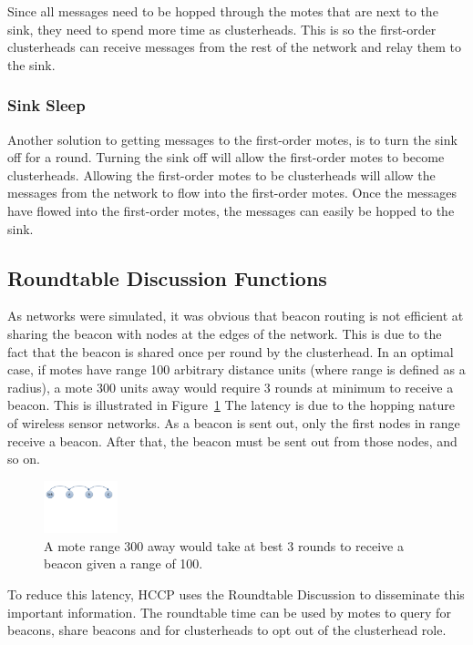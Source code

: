 Since all messages need to be hopped through the motes that are next to the sink, they need to spend more time 
as clusterheads. This is so the first-order clusterheads can receive messages from the rest of the network and 
relay them to the sink.

\subsubsection{Sink Sleep}

Another solution to getting messages to the first-order motes, is to turn
the sink off for a round. Turning the sink off will allow the first-order
motes to become clusterheads. Allowing the first-order motes to be clusterheads
will allow the messages from the network to flow into the first-order motes. Once the 
messages have flowed into the first-order motes, the messages can easily be hopped to the sink.



\subsection{Roundtable Discussion Functions}

As networks were simulated, it was obvious that beacon routing is not efficient at 
sharing the beacon with nodes at the edges of the network. This is due to the fact
that the beacon is shared once per round by the clusterhead. In an optimal case, if
motes have range 100 arbitrary distance units (where range is defined as a radius), a
mote 300 units away would require 3 rounds at minimum to receive a beacon. This
is illustrated in Figure~\ref{fig:images_moteRange_rangeBeacon}
The latency is due to the hopping nature of wireless sensor networks. 
As a beacon is sent out, only the first nodes in range receive a beacon. After that,
the beacon must be sent out from those nodes, and so on. 

\begin{figure}[htbp]
	\centering
		\includegraphics[height=0.6in]{images/moteRange/BetterRangeBeacon.pdf}
	\caption{A mote range 300 away would take at best 3 rounds to receive a beacon given a range of 100.}
	\label{fig:images_moteRange_rangeBeacon}
\end{figure}

To reduce this latency, HCCP uses the Roundtable Discussion to disseminate this important information.
The roundtable time can be used by motes to query for beacons, share beacons and for clusterheads to 
opt out of the clusterhead role. 

